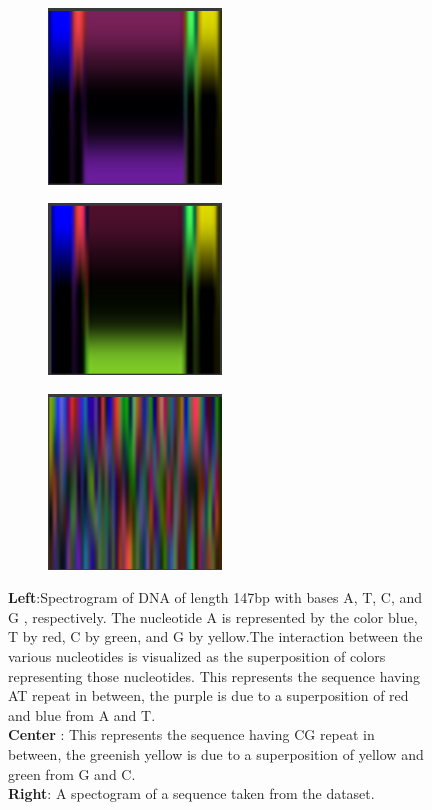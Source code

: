 \documentclass{article}
\begin{document}
\begin{figure}[H]
  \centering
  \begin{subfigure}{4.6cm}
    \centering\includegraphics[width=4.6cm]{ATAT.png}
  \end{subfigure}
  \begin{subfigure}{4.6cm}
    \centering\includegraphics[width=4.6cm]{CGCG.png}
  \end{subfigure}
  \begin{subfigure}{4.6cm}
    \centering\includegraphics[width=4.6cm]{sequence.png}
  \end{subfigure}
  \caption{ \textbf{Left}:Spectrogram of DNA of length 147bp with bases A, T, C, and G , respectively. The nucleotide A is represented by the color blue, T by red, C by green, and G by yellow.The interaction between the various nucleotides is visualized as the superposition of colors representing those nucleotides.
  This represents the sequence having AT repeat in between,  the purple is due to a superposition of red and blue from A and T. \\
  \textbf{Center} : This represents the sequence having CG repeat in between,  the greenish yellow is due to a superposition of yellow and green from G and C.\\
  \textbf{Right}: A spectogram of a sequence taken from the dataset.}
  \label{fig:ROC}
\end{figure}
\end{document}
